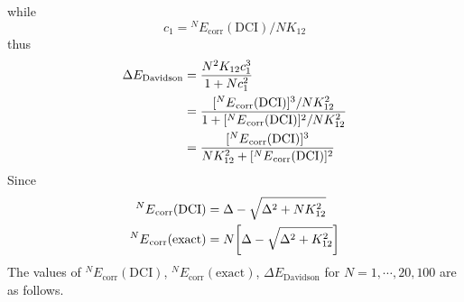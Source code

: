 \documentclass[a4paper]{article}
\DeclareMathOperator{\corr}{\mathrm{corr}}
\numberwithin{equation}{subsection}
\begin{document}
while
\begin{equation}\label{key}
c_1 = {^N E}_{\corr}(\text{DCI}) / NK_{12}
\end{equation}
thus
\begin{align}
\Delta E_{\text{Davidson}} &= \dfrac{N^2 K_{12} c_1^3}{1 + N c_1^2} \notag\\
&= \dfrac{[{^N E}_{\corr}(\text{DCI})]^3 / NK_{12}^2}{1 + [{^N E}_{\corr}(\text{DCI})]^2 / NK_{12}^2} \notag\\
&= \dfrac{[{^N E}_{\corr}(\text{DCI})]^3}{NK_{12}^2 + [{^N E}_{\corr}(\text{DCI})]^2 }
\end{align}
Since
\begin{align}
{^N E}_{\corr}(\text{DCI}) &= \Delta - \sqrt{\Delta^2 + N K_{12}^2} \\
{^N E}_{\corr}(\text{exact}) &= N\qty[\Delta - \sqrt{\Delta^2 + K_{12}^2}]
\end{align}
\newpage
The values of $ {^N E}_{\corr}(\text{DCI}) $, $ {^N E}_{\corr}(\text{exact}) $, $ \Delta E_{\text{Davidson}} $ for $ N=1,\cdots, 20, 100 $ are as follows.
\end{document}
